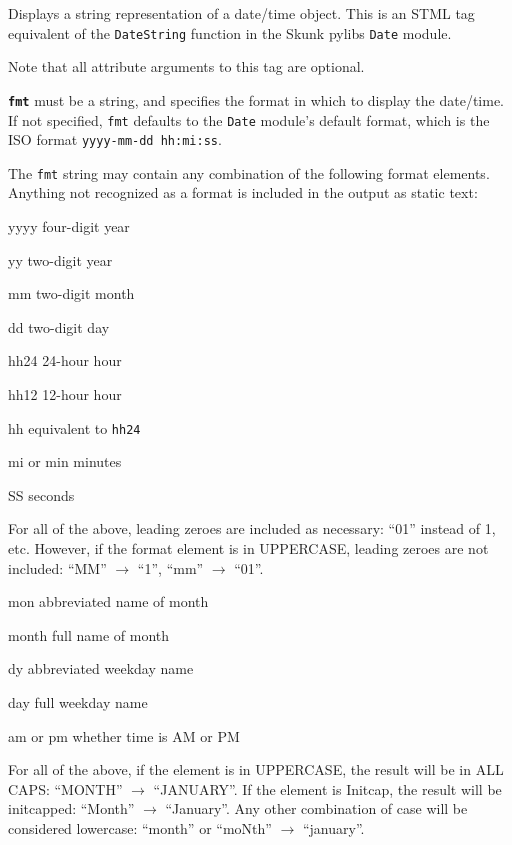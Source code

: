 \documentclass{manual}
\begin{document}
Displays a string representation of a date/time object. This is 
an STML tag equivalent of the \texttt{DateString} function
in the Skunk pylibs \texttt{Date} module.

Note that all attribute arguments to this tag are optional.

\texttt{\textbf{fmt}} must be a string, and specifies the format in 
which to display the date/time. If not specified, \texttt{fmt} defaults to
the \texttt{Date} module's default format, which is the ISO format
\texttt{yyyy-mm-dd hh:mi:ss}.

    The \texttt{fmt} string may contain any combination of the 
    following format elements. Anything not recognized 
    as a format is included in the output as static text:

\begin{argdesc}
\item[yyyy] four-digit year
\item[yy] two-digit year
\item[mm] two-digit month
\item[dd] two-digit day
\item[hh24] 24-hour hour
\item[hh12] 12-hour hour
\item[hh] equivalent to \texttt{hh24}
\item[mi] or min minutes
\item[SS] seconds
\end{argdesc}

    For all of the above, leading zeroes are included 
    as necessary: ``01'' instead of 1, etc. However, 
    if the format element is in UPPERCASE, leading zeroes 
    are not included: ``MM'' $\rightarrow$ ``1'', ``mm'' $\rightarrow$ ``01''.

\begin{argdesc}
\item[mon] abbreviated name of month
\item[month] full name of month
\item[dy] abbreviated weekday name
\item[day] full weekday name
\item[am or pm] whether time is AM or PM
\end{argdesc}


    For all of the above, if the element is in UPPERCASE, 
    the result will be in ALL CAPS: ``MONTH'' $\rightarrow$ ``JANUARY''. 
    If the element is Initcap, the result will be initcapped: 
    ``Month'' $\rightarrow$ ``January''. Any other combination of case will 
    be considered lowercase: ``month'' or ``moNth'' $\rightarrow$ ``january''.
    
\end{document}
